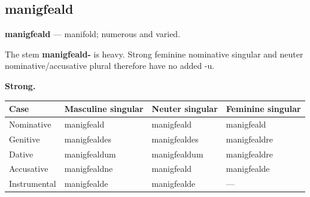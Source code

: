 \subsection*{manigfeald}

\par\begin{minipage}{\linewidth}\raggedright
\textbf{manigfeald} — manifold; numerous and varied.

The stem \textbf{manigfeald-} is heavy. Strong feminine nominative singular and neuter nominative/\allowbreak{}accusative plural therefore have no added -u.

\textbf{Strong.}

\par\begingroup
\fontsize{10.5}{13.2}\selectfont
\par\begin{minipage}{\linewidth}\raggedright
\setlength{\LTleft}{0pt}\setlength{\LTright}{\fill}
\noindent
\begin{tabular}{@{}>{\raggedright\arraybackslash}p{22mm}>{\raggedright\arraybackslash}p{31.18mm}>{\raggedright\arraybackslash}p{31.18mm}>{\raggedright\arraybackslash}p{31.18mm}@{}}
\toprule
\textbf{Case} & \textbf{Masculine singular} & \textbf{Neuter singular} & \textbf{Feminine singular} \\
\midrule
Nominative & manigfeald & manigfeald & manigfeald \\
Genitive & manigfealdes & manigfealdes & manigfealdre \\
Dative & manigfealdum & manigfealdum & manigfealdre \\
Accusative & manigfealdne & manigfeald & manigfealde \\
Instrumental & manigfealde & manigfealde & — \\
\bottomrule
\end{tabular}
\end{minipage}\par
\par\endgroup
\end{minipage}\par
\par\addvspace{5pt}
